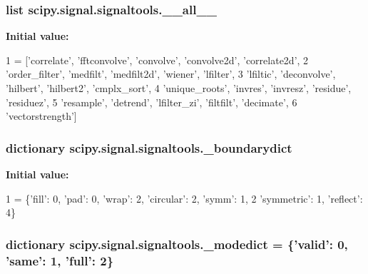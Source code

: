\subsubsection[{\+\_\+\+\_\+all\+\_\+\+\_\+}]{\setlength{\rightskip}{0pt plus 5cm}list scipy.\+signal.\+signaltools.\+\_\+\+\_\+all\+\_\+\+\_\+}\label{namespacescipy_1_1signal_1_1signaltools_a18b112c5f3754320389080c509ae3593}
{\bfseries Initial value\+:}
\begin{DoxyCode}
1 = [\textcolor{stringliteral}{'correlate'}, \textcolor{stringliteral}{'fftconvolve'}, \textcolor{stringliteral}{'convolve'}, \textcolor{stringliteral}{'convolve2d'}, \textcolor{stringliteral}{'correlate2d'},
2            \textcolor{stringliteral}{'order\_filter'}, \textcolor{stringliteral}{'medfilt'}, \textcolor{stringliteral}{'medfilt2d'}, \textcolor{stringliteral}{'wiener'}, \textcolor{stringliteral}{'lfilter'},
3            \textcolor{stringliteral}{'lfiltic'}, \textcolor{stringliteral}{'deconvolve'}, \textcolor{stringliteral}{'hilbert'}, \textcolor{stringliteral}{'hilbert2'}, \textcolor{stringliteral}{'cmplx\_sort'},
4            \textcolor{stringliteral}{'unique\_roots'}, \textcolor{stringliteral}{'invres'}, \textcolor{stringliteral}{'invresz'}, \textcolor{stringliteral}{'residue'}, \textcolor{stringliteral}{'residuez'},
5            \textcolor{stringliteral}{'resample'}, \textcolor{stringliteral}{'detrend'}, \textcolor{stringliteral}{'lfilter\_zi'}, \textcolor{stringliteral}{'filtfilt'}, \textcolor{stringliteral}{'decimate'},
6            \textcolor{stringliteral}{'vectorstrength'}]
\end{DoxyCode}
\hypertarget{namespacescipy_1_1signal_1_1signaltools_a8dd98af7a22a25e2c10b79108937681e}{}
\subsubsection[{\+\_\+boundarydict}]{\setlength{\rightskip}{0pt plus 5cm}dictionary scipy.\+signal.\+signaltools.\+\_\+boundarydict}\label{namespacescipy_1_1signal_1_1signaltools_a8dd98af7a22a25e2c10b79108937681e}
{\bfseries Initial value\+:}
\begin{DoxyCode}
1 = \{\textcolor{stringliteral}{'fill'}: 0, \textcolor{stringliteral}{'pad'}: 0, \textcolor{stringliteral}{'wrap'}: 2, \textcolor{stringliteral}{'circular'}: 2, \textcolor{stringliteral}{'symm'}: 1,
2                  \textcolor{stringliteral}{'symmetric'}: 1, \textcolor{stringliteral}{'reflect'}: 4\}
\end{DoxyCode}
\hypertarget{namespacescipy_1_1signal_1_1signaltools_a892a22e92c69038066cb62110ed13dab}{}
\subsubsection[{\+\_\+modedict}]{\setlength{\rightskip}{0pt plus 5cm}dictionary scipy.\+signal.\+signaltools.\+\_\+modedict = \{'valid'\+: 0, 'same'\+: 1, 'full'\+: 2\}}\label{namespacescipy_1_1signal_1_1signaltools_a892a22e92c69038066cb62110ed13dab}
